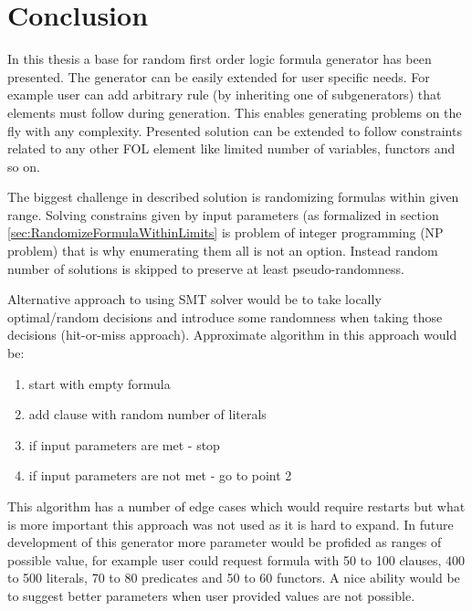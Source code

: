 \chapter{Conclusion}

In this thesis a base for random first order logic formula generator has been presented. The generator can be easily extended for user specific needs. For example user can add arbitrary rule (by inheriting one of subgenerators) that elements must follow during generation. This enables generating problems on the fly with any complexity.
Presented solution can be extended to follow constraints related to any other \gls{FOL} element like limited number of variables, functors and so on.

The biggest challenge in described solution is randomizing formulas within given range. Solving constrains given by input parameters (as formalized in section \ref{sec:RandomizeFormulaWithinLimits} is problem of integer programming (NP problem) that is why enumerating them all is not an option. Instead random number of solutions is skipped to preserve at least pseudo-randomness. 

Alternative approach to using \gls{SMT} solver would be to take locally optimal/random decisions and introduce some randomness when taking those decisions (hit-or-miss approach). Approximate algorithm in this approach would be:

\begin{enumerate}
  \item start with empty formula
  \item add clause with random number of literals
  \item if input parameters are met - stop
  \item if input parameters are not met - go to point 2
\end{enumerate}

This algorithm has a number of edge cases which would require restarts but what is more important this approach was not used as it is hard to expand. In future development of this generator more parameter would be profided as ranges of possible value, for example user could request formula with 50 to 100 clauses, 400 to 500 literals, 70 to 80 predicates and 50 to 60 functors. A nice ability would be to suggest better parameters when user provided values are not possible.
